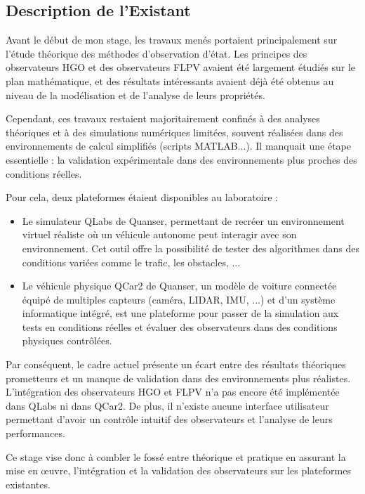 \documentclass{name}
\begin{document}
\newpage

\subsection{Description de l'Existant}

Avant le début de mon stage, les travaux menés portaient principalement sur l'étude théorique des méthodes d'observation d'état. Les principes des observateurs HGO et des observateurs FLPV avaient été largement étudiés sur le plan mathématique, et des résultats intéressants avaient déjà été obtenus au niveau de la modélisation et de l'analyse de leurs propriétés. 

Cependant, ces travaux restaient majoritairement confinés à des analyses théoriques et à des simulations numériques limitées, souvent réalisées dans des environnements de calcul simplifiés (scripts MATLAB...). Il manquait une étape essentielle : la validation expérimentale dans des environnements plus proches des conditions réelles.

Pour cela, deux plateformes étaient disponibles au laboratoire :

\begin{itemize}
  \item Le simulateur QLabs de Quanser, permettant de recréer un environnement virtuel réaliste où un véhicule autonome peut interagir avec son environnement. Cet outil offre la possibilité de tester des algorithmes dans des conditions variées comme le trafic, les obstacles, ...
  \item Le véhicule physique QCar2 de Quanser, un modèle de voiture connectée équipé de multiples capteurs (caméra, LIDAR, IMU, ...) et d'un système informatique intégré, est une plateforme pour passer de la simulation aux tests en conditions réelles et évaluer des observateurs dans des conditions physiques contrôlées.
\end{itemize}

Par conséquent, le cadre actuel présente un écart entre des résultats théoriques prometteurs et un manque de validation dans des environnements plus réalistes. L'intégration des observateurs HGO et FLPV n'a pas encore été implémentée dans QLabs ni dans QCar2. De plus, il n'existe aucune interface utilisateur permettant d'avoir un contrôle intuitif des observateurs et l'analyse de leurs performances.

Ce stage vise donc à combler le fossé entre théorique et pratique en assurant la mise en œuvre, l'intégration et la validation des observateurs sur les plateformes existantes.
\end{document}
